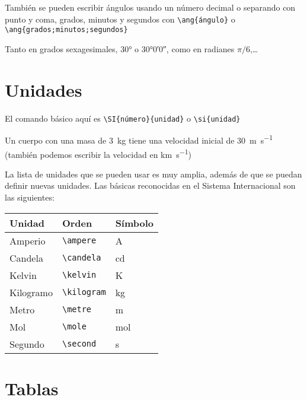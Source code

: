 \documentclass[11pt]{article}
\begin{document}
También se pueden escribir ángulos usando un número decimal o separando con punto y coma, grados, minutos y segundos con \verb|\ang{ángulo}| o \verb|\ang{grados;minutos;segundos}|
\begin{LTXexample}[pos=l,rframe={}]
Tanto en grados sexagesimales, \ang{30} o \ang{30;0;0}, como en radianes $\pi/6$,\dots
\end{LTXexample}


\section{Unidades}

El comando básico aquí es \texttt{\textbackslash{}SI\{número\}\{unidad\}} o  \texttt{\textbackslash{}si\{unidad\}}
\begin{LTXexample}[pos=l,rframe={}]
Un cuerpo con una masa de \SI{3}{\kilo\gram} tiene una velocidad inicial de \SI{30}{\meter\per\second} (tambi\'en podemos escribir la velocidad en \si{\kilo\meter\per\second})
\end{LTXexample}

La lista de unidades que se pueden usar es muy amplia, además de que se puedan definir nuevas unidades. Las básicas reconocidas en el Sistema Internacional son  las siguientes:

\begin{center}  
\begin{tabular}{@{}lll@{}}
    \toprule
      Unidad & Orden & Símbolo \\
    \midrule
      Amperio & \verb|\ampere| & \si{\ampere}   \\
      Candela & \verb|\candela| & \si{\candela}  \\
      Kelvin  & \verb|\kelvin| & \si{\kelvin}   \\
	  Kilogramo  & \verb|\kilogram| & \si{\kilogram}\\
      Metro & \verb|\metre| & \si{\metre}    \\
      Mol & \verb|\mole| & \si{\mole}     \\
      Segundo & \verb|\second| & \si{\second}   \\
    \bottomrule
  \end{tabular}
\end{center}




\section{Tablas}
\end{document}
